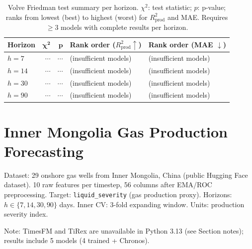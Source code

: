 \documentclass[11pt]{article}
\newcommand{\rp}{R^2_\text{prod}}
\begin{document}
\begin{table}[ht]
\centering
\caption{Volve Friedman test summary per horizon.
$\chi^2$: test statistic; $p$: p-value; ranks from lowest (best) to highest (worst) for $\rp$ and MAE.
Requires $\geq 3$ models with complete results per horizon.}
\label{tab:volve_friedman}
\small
\setlength{\tabcolsep}{3pt}
\begin{tabular}{@{}l rr l l@{}}
\toprule
\textbf{Horizon} & $\boldsymbol{\chi^2}$ & $\boldsymbol{p}$ & \textbf{Rank order ($\rp \uparrow$)} & \textbf{Rank order (MAE $\downarrow$)} \\
\midrule
$h{=}7$    & $\cdots$ & $\cdots$ & (insufficient models) & (insufficient models) \\
$h{=}14$   & $\cdots$ & $\cdots$ & (insufficient models) & (insufficient models) \\
$h{=}30$   & $\cdots$ & $\cdots$ & (insufficient models) & (insufficient models) \\
$h{=}90$   & $\cdots$ & $\cdots$ & (insufficient models) & (insufficient models) \\
\bottomrule
\end{tabular}
\end{table}

\newpage
\section{Inner Mongolia Gas Production Forecasting}

Dataset: 29 onshore gas wells from Inner Mongolia, China (public Hugging Face dataset).
10 raw features per timestep, 56 columns after EMA/ROC preprocessing.
Target: \texttt{liquid\_severity} (gas production proxy).
Horizons: $h \in \{7, 14, 30, 90\}$ days.
Inner CV: 3-fold expanding window. Units: production severity index.

Note: TimesFM and TiRex are unavailable in Python 3.13 (see Section notes); results include 5 models
(4 trained + Chronos).
\end{document}
